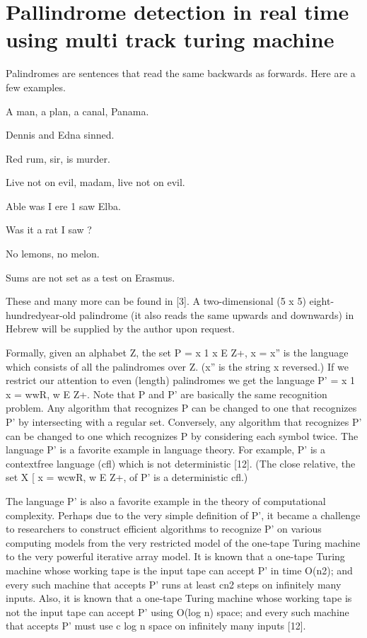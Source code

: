 \documentclass[11pt,a4paper]{report}
\begin{document}
\pagebreak

\tableofcontents

\chapter{Pallindrome detection in real time using multi track turing machine}

Palindromes are sentences that read the same backwards as forwards. Here are a few
examples.

\begin{center}
    
A man, a plan, a canal, Panama.

Dennis and Edna sinned.

Red rum, sir, is murder.

Live not on evil, madam, live not on evil.

Able was I ere 1 saw Elba.

Was it a rat I saw ?

No lemons, no melon.

Sums are not set as a test on Erasmus.
\end{center}


These and many more can be found in [3]. A two-dimensional (5 x 5) eight-hundredyear-old palindrome (it also reads the same upwards and downwards) in Hebrew will
be supplied by the author upon request.

Formally, given an alphabet Z, the set P = {x 1 x E Z+, x = x”} is the language
which consists of all the palindromes over Z. (x” is the string x reversed.) If we restrict
our attention to even (length) palindromes we get the language P’ = {x 1 x = wwR,
w E Z+}. Note that P and P’ are basically the same recognition problem. Any algorithm
that recognizes P can be changed to one that recognizes P’ by intersecting with a regular
set. Conversely, any algorithm that recognizes P’ can be changed to one which recognizes
P by considering each symbol twice.
The language P’ is a favorite example in language theory. For example, P’ is a contextfree language (cfl) which is not deterministic [12]. (The close relative, the set {X [ x =
wcwR, w E Z+}, of P’ is a deterministic cfl.)


The language P’ is also a favorite example in the theory of computational complexity.
Perhaps due to the very simple definition of P’, it became a challenge to researchers to
construct efficient algorithms to recognize P’ on various computing models from the very
restricted model of the one-tape Turing machine to the very powerful iterative array
model. It is known that a one-tape Turing machine whose working tape is the input tape
can accept P’ in time O(n2); and every such machine that accepts P’ runs at least cn2
steps on infinitely many inputs. Also, it is known that a one-tape Turing machine whose
working tape is not the input tape can accept P’ using O(log n) space; and every such
machine that accepts P’ must use c log n space on infinitely many inputs [12].
\end{document}
